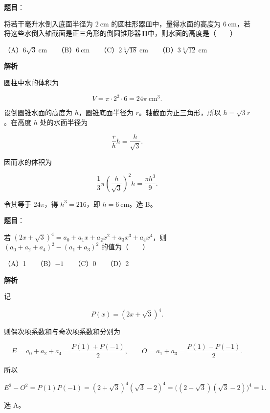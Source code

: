 \begin{answer}

\textbf{题目}：

将若干毫升水倒入底面半径为 $2\ \mathrm{cm}$ 的圆柱形器皿中，量得水面的高度为 $6\ \mathrm{cm}$，若将这些水倒入轴截面是正三角形的倒圆锥形器皿中，则水面的高度是\mbox{（　　）}

（A）$6\sqrt3\ \mathrm{cm}$　　（B）$6\ \mathrm{cm}$　　（C）$2\sqrt[3]{18}\ \mathrm{cm}$　　（D）$3\sqrt[3]{12}\ \mathrm{cm}$

\textbf{解析}

圆柱中水的体积为

\nopagebreak[4]
\[
V=\pi\cdot2^2\cdot6=24\pi\ \mathrm{cm^3}.
\]

设倒圆锥水面的高度为 $h$，圆锥底面半径为 $r$。轴截面为正三角形，所以 $h=\sqrt3r$。在高度 $h$ 处的水面半径为

\nopagebreak[4]
\[
\frac r h h=\frac h{\sqrt3}.
\]

因而水的体积为

\nopagebreak[4]
\[
\frac13\pi\left(\frac h{\sqrt3}\right)^2h
=\frac{\pi h^3}{9}.
\]

令其等于 $24\pi$，得 $h^3=216$，即 $h=6\ \mathrm{cm}$。选 B。


\end{answer}
\begin{answer}

\textbf{题目}：

若 $(2x+\sqrt3)^4=a_0+a_1x+a_2x^2+a_3x^3+a_4x^4$，则 $(a_0+a_2+a_4)^2-(a_1+a_3)^2$ 的值为\mbox{（　　）}

（A）1　　（B）$-1$　　（C）0　　（D）2

\textbf{解析}

记

\nopagebreak[4]
\[
P(x)=(2x+\sqrt3)^4.
\]

则偶次项系数和与奇次项系数和分别为

\nopagebreak[4]
\[
E=a_0+a_2+a_4=\frac{P(1)+P(-1)}2,
\qquad
O=a_1+a_3=\frac{P(1)-P(-1)}2.
\]

所以

\nopagebreak[4]
\[
E^2-O^2=P(1)P(-1)
=(2+\sqrt3)^4(\sqrt3-2)^4
=\bigl((2+\sqrt3)(\sqrt3-2)\bigr)^4=1.
\]

选 A。


\end{answer}
